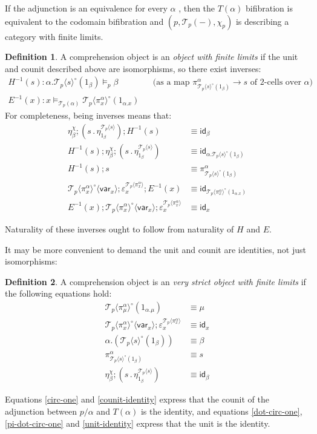 \documentclass[10pt]{article}
\theoremstyle{definition}
\newtheorem{definition}{Definition}
\newcommand\TrCirc[2]{\ensuremath{{#1}^\circ(#2)}}
\newcommand\var[1]{\ensuremath{\mathsf{var}_{#1}}}
\newcommand{\id}{\mathsf{id}}
\newcommand\El[2]{\mathcal{T}_{#1}(#2)}
\newcommand\ApEl[2]{\mathcal{T}_{#1}\langle#2\rangle}
\newcommand\ap[2]{\ensuremath{#1 \langle #2 \rangle }}
\newcommand\bdot[0]{\mathbin{.}}
\begin{document}
If the adjunction is an equivalence for every $\alpha$ , then the $T(\alpha)$ bifibration is equivalent to the codomain bifibration and $(p,\El{p}{-},\chi_p)$ is describing a category with finite limits. 

\begin{definition}
  A comprehension object is an \emph{object with finite limits} if the unit and counit described above are isomorphisms, so there exist inverses:
  \begin{align*}
  H^{-1}(s) : \alpha.\TrCirc{\ApEl{p}{s}}{1_\beta} \vDash_p \beta && \text{(as a map $\pi^\alpha_{\TrCirc{\ApEl{p}{s}}{1_\beta}} \to s$ of 2-cells over $\alpha$)} \\
  E^{-1}(x) : x \vDash_{\El{p}{\alpha}} \TrCirc{\ApEl{p}{\pi^\alpha_x}}{1_{\alpha.x}}
  \end{align*}
  For completeness, being inverses means that:
  \begin{align*}
  \eta^\chi_\beta ; (s \bdot \eta^{\ApEl{p}{s}}_{1_\beta}) ; H^{-1}(s) &\equiv \id_\beta \\
   H^{-1}(s) ; \eta^\chi_\beta ; (s \bdot \eta^{\ApEl{p}{s}}_{1_\beta}) &\equiv \id_{\alpha.\TrCirc{\ApEl{p}{s}}{1_\beta}} \\
   H^{-1}(s) ; s &\equiv \pi^\alpha_{\TrCirc{\ApEl{p}{s}}{1_\beta}} \\
   \ap{\ApEl{p}{\pi^\alpha_x}^\circ}{\var{x}} ; \varepsilon^{\ApEl{p}{\pi^\alpha_x}}_x ; E^{-1}(x) &\equiv \id_{\TrCirc{\ApEl{p}{\pi^\alpha_x}}{1_{\alpha.x}}} \\
   E^{-1}(x) ; \ap{\ApEl{p}{\pi^\alpha_x}^\circ}{\var{x}} ; \varepsilon^{\ApEl{p}{\pi^\alpha_x}}_x &\equiv \id_x  
  \end{align*}
\end{definition}

Naturality of these inverses ought to follow from naturality of $H$ and $E$.

It may be more convenient to demand the unit and counit are identities, not just isomorphisms:

\begin{definition}
  A comprehension object is an \emph{very strict object with finite limits} if the following equations hold:
  \begin{align}
\label{circ-one}
\ApEl{p}{\pi^\alpha_\mu}^\circ(1_{\alpha.\mu}) &\equiv \mu \\
\label{counit-identity}
\ap{\ApEl{p}{\pi^\alpha_x}^\circ}{\var{x}} ; \varepsilon^{\ApEl{p}{\pi^\alpha_x}}_x &\equiv \id_x \\
\label{dot-circ-one}
\alpha.(\ApEl{p}{s}^\circ(1_\beta)) &\equiv \beta \\
\label{pi-dot-circ-one}
\pi^\alpha_{\ApEl{p}{s}^\circ(1_\beta)} &\equiv s \\
\label{unit-identity}
\eta^\chi_\beta ; (s \bdot \eta^{\ApEl{p}{s}}_{1_\beta}) &\equiv \id_\beta
  \end{align}
\end{definition}
Equations \eqref{circ-one} and \eqref{counit-identity} express that the counit of the adjunction between $p/\alpha$ and $T(\alpha)$ is the identity, and equations \eqref{dot-circ-one}, \eqref{pi-dot-circ-one} and \eqref{unit-identity} express that the unit is the identity.
\end{document}
